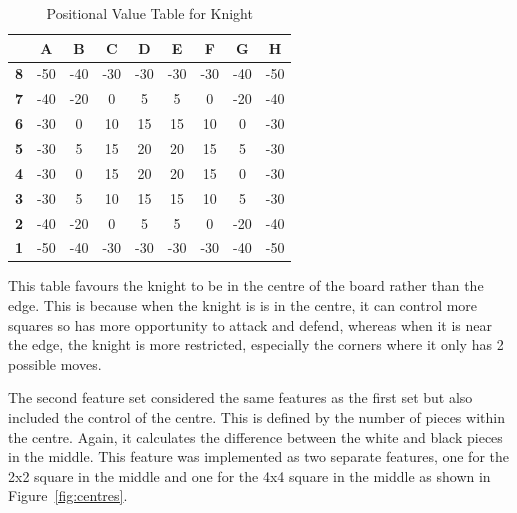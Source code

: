 \begin{table}[h]
    \centering
    \begin{tabular}{|c|c|c|c|c|c|c|c|c|}
        \hline
        \textbf{} & \textbf{A} & \textbf{B} & \textbf{C} & \textbf{D} & \textbf{E} & \textbf{F} & \textbf{G} & \textbf{H} \\
        \hline
        \textbf{8} & -50 & -40 & -30 & -30 & -30 & -30 & -40 & -50 \\
        \textbf{7} & -40 & -20 & 0 & 5 & 5 & 0 & -20 & -40 \\
        \textbf{6} & -30 & 0 & 10 & 15 & 15 & 10 & 0 & -30 \\
        \textbf{5} & -30 & 5 & 15 & 20 & 20 & 15 & 5 & -30 \\
        \textbf{4} & -30 & 0 & 15 & 20 & 20 & 15 & 0 & -30 \\
        \textbf{3} & -30 & 5 & 10 & 15 & 15 & 10 & 5 & -30 \\
        \textbf{2} & -40 & -20 & 0 & 5 & 5 & 0 & -20 & -40 \\
        \textbf{1} & -50 & -40 & -30 & -30 & -30 & -30 & -40 & -50 \\
        \hline
    \end{tabular}
    \caption{Positional Value Table for Knight}
    \label{tab:knight_positional_values}
\end{table}

This table favours the knight to be in the centre of the board rather than the edge. This is because when the knight is is in the centre, it can control more squares so has more opportunity to attack and defend, whereas when it is near the edge, the knight is more restricted, especially the corners where it only has 2 possible moves.

The second feature set considered the same features as the first set but also included the control of the centre. This is defined by the number of pieces within the centre. Again, it calculates the difference between the white and black pieces in the middle. This feature was implemented as two separate features, one for the 2x2 square in the middle and one for the 4x4 square in the middle as shown in Figure~\ref{fig:centres}.

